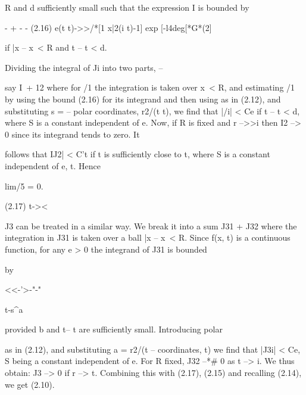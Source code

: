 R and d sufficiently small such that the expression I is bounded by

\begin{ocrformula}
-                    +         -               -
(2.16)         e(t           t)->>/*[1          \x           x|2(i           t)-1] exp
[-l4deg[*G*(2]
\end{ocrformula}

\begin{ocrformula}
if |x --  x\ < R and t
-- t < d.
\end{ocrformula}

Dividing the integral of Ji into two parts, --

\begin{ocrformula}
say I\ + 12 where for /1 the integration is taken over \x             x\ < R, and
estimating   /1 by using the bound    (2.16) for its integrand    and then using
as in (2.12), and substituting    s  =         --
polar coordinates,                                           r2/(t      t), we find
that |/i| < Ce if t --  t < d, where S is a constant independent          of e. Now,
if R is fixed and r -->>i then I2 --> 0 since its integrand       tends to zero. It
\end{ocrformula}

follows that IJ2| < C't if t is sufficiently close to t, where S is a constant independent of e, t. Hence

lim/5 = 0.

\begin{ocrformula}
(2.17)
t-><
\end{ocrformula}

\begin{ocrformula}
J3 can be treated in a similar way. We   break it into a sum J31 + J32
where the integration in J31 is taken over a ball |x -- x\ < R. Since f(x, t)
is a continuous  function, for any e > 0 the integrand    of J31 is bounded
\end{ocrformula}

by

\begin{ocrformula}
<<-'>-"-"
\end{ocrformula}

t-s\textasciicircum{}a

provided b and t-- t are sufficiently small. Introducing polar

\begin{ocrformula}
as in (2.12), and substituting a = r2/(t --
coordinates,                                                                            t) we find that |J3i| < Ce,
S being a constant   independent     of e. For                                     R fixed, J32 --*# 0 as t --> i. We
thus obtain: J3  --> 0 if r  -->  t. Combining                                         this   with     (2.17),     (2.15)    and
recalling (2.14), we get (2.10).
\end{ocrformula}

